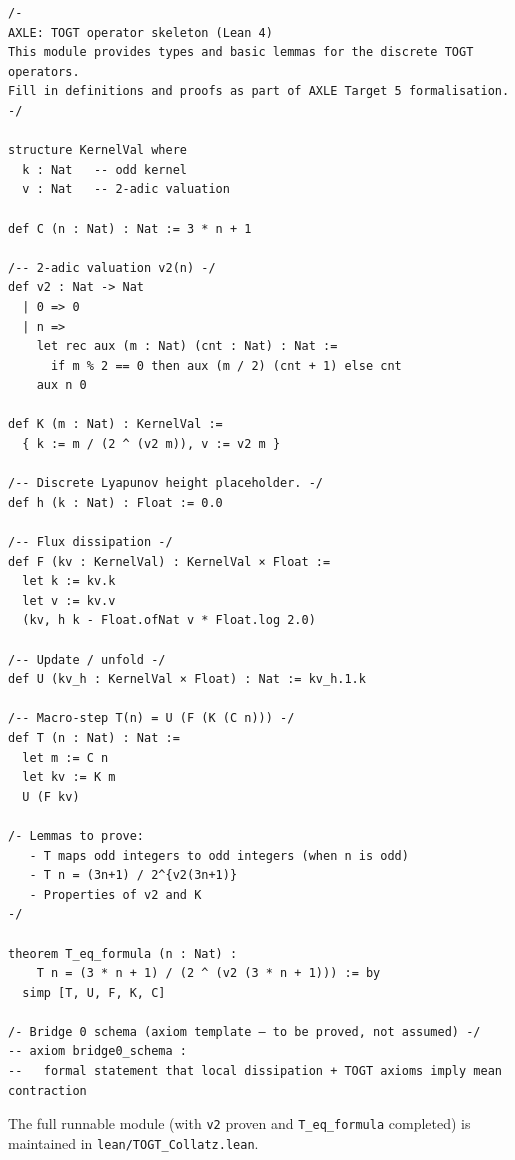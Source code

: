 \documentclass[11pt,a4paper]{article}
\theoremstyle{definition}
\theoremstyle{plain}
\begin{document}
\begin{verbatim}
/-
AXLE: TOGT operator skeleton (Lean 4)
This module provides types and basic lemmas for the discrete TOGT operators.
Fill in definitions and proofs as part of AXLE Target 5 formalisation.
-/

structure KernelVal where
  k : Nat   -- odd kernel
  v : Nat   -- 2-adic valuation

def C (n : Nat) : Nat := 3 * n + 1

/-- 2-adic valuation v2(n) -/
def v2 : Nat -> Nat
  | 0 => 0
  | n =>
    let rec aux (m : Nat) (cnt : Nat) : Nat :=
      if m % 2 == 0 then aux (m / 2) (cnt + 1) else cnt
    aux n 0

def K (m : Nat) : KernelVal :=
  { k := m / (2 ^ (v2 m)), v := v2 m }

/-- Discrete Lyapunov height placeholder. -/
def h (k : Nat) : Float := 0.0

/-- Flux dissipation -/
def F (kv : KernelVal) : KernelVal × Float :=
  let k := kv.k
  let v := kv.v
  (kv, h k - Float.ofNat v * Float.log 2.0)

/-- Update / unfold -/
def U (kv_h : KernelVal × Float) : Nat := kv_h.1.k

/-- Macro-step T(n) = U (F (K (C n))) -/
def T (n : Nat) : Nat :=
  let m := C n
  let kv := K m
  U (F kv)

/- Lemmas to prove:
   - T maps odd integers to odd integers (when n is odd)
   - T n = (3n+1) / 2^{v2(3n+1)}
   - Properties of v2 and K
-/

theorem T_eq_formula (n : Nat) :
    T n = (3 * n + 1) / (2 ^ (v2 (3 * n + 1))) := by
  simp [T, U, F, K, C]

/- Bridge 0 schema (axiom template — to be proved, not assumed) -/
-- axiom bridge0_schema :
--   formal statement that local dissipation + TOGT axioms imply mean contraction
\end{verbatim}

The full runnable module (with \texttt{v2} proven and \texttt{T\_eq\_formula} completed) is
maintained in \texttt{lean/TOGT\_Collatz.lean}.
\end{document}
